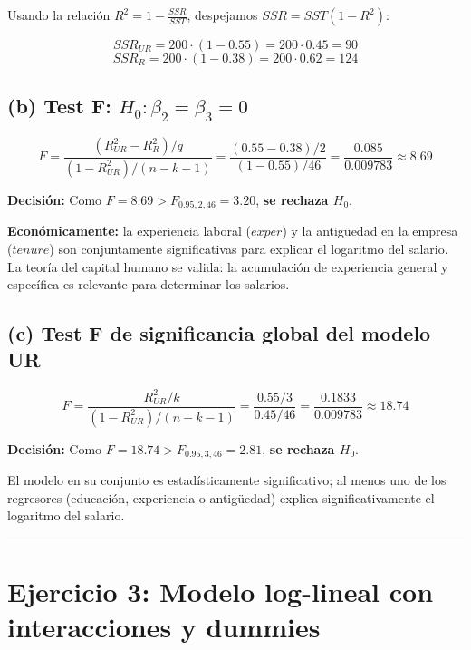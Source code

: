 \documentclass[11pt,a4paper]{article}
\begin{document}
Usando la relación \(R^2 = 1 - \frac{SSR}{SST}\), despejamos \(SSR = SST(1-R^2)\):

\[
SSR_{UR} = 200 \cdot (1 - 0.55) = 200 \cdot 0.45 = 90
\]
\[
SSR_R = 200 \cdot (1 - 0.38) = 200 \cdot 0.62 = 124
\]

\subsection*{(b) Test F: \(H_0: \beta_2 = \beta_3 = 0\)}

\[
F = \frac{(R^2_{UR}-R^2_R)/q}{(1-R^2_{UR})/(n-k-1)} = \frac{(0.55-0.38)/2}{(1-0.55)/46} = \frac{0.085}{0.009783} \approx 8.69
\]

\textbf{Decisión:} Como \(F = 8.69 > F_{0.95,2,46} = 3.20\), \textbf{se rechaza \(H_0\)}.

\begin{conclusion}
\textbf{Económicamente:} la experiencia laboral (\(exper\)) y la antigüedad en la empresa (\(tenure\)) son conjuntamente significativas para explicar el logaritmo del salario. La teoría del capital humano se valida: la acumulación de experiencia general y específica es relevante para determinar los salarios.
\end{conclusion}

\subsection*{(c) Test F de significancia global del modelo UR}

\[
F = \frac{R^2_{UR}/k}{(1-R^2_{UR})/(n-k-1)} = \frac{0.55/3}{0.45/46} = \frac{0.1833}{0.009783} \approx 18.74
\]

\textbf{Decisión:} Como \(F = 18.74 > F_{0.95,3,46} = 2.81\), \textbf{se rechaza \(H_0\)}.

\begin{conclusion}
El modelo en su conjunto es estadísticamente significativo; al menos uno de los regresores (educación, experiencia o antigüedad) explica significativamente el logaritmo del salario.
\end{conclusion}

\vspace{0.5cm}
\hrule
\vspace{0.5cm}

\section*{Ejercicio 3: Modelo log-lineal con interacciones y dummies}
\end{document}
